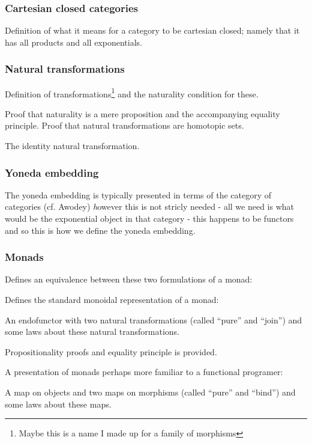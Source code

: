 \subsubsection{Cartesian closed categories}
Definition of what it means for a category to be cartesian closed; namely that
it has all products and all exponentials.

\subsubsection{Natural transformations}
Definition of transformations\footnote{Maybe this is a name I made up for a
  family of morphisms} and the naturality condition for these.

Proof that naturality is a mere proposition and the accompanying equality
principle. Proof that natural transformations are homotopic sets.

The identity natural transformation.

\subsubsection{Yoneda embedding}

The yoneda embedding is typically presented in terms of the category of
categories (cf. Awodey) \emph however this is not stricly needed - all we need
is what would be the exponential object in that category - this happens to be
functors and so this is how we define the yoneda embedding.

\subsubsection{Monads}

Defines an equivalence between these two formulations of a monad:


Defines the standard monoidal representation of a monad:

An endofunctor with two natural transformations (called ``pure'' and ``join'')
and some laws about these natural transformations.

Propositionality proofs and equality principle is provided.


A presentation of monads perhaps more familiar to a functional programer:

A map on objects and two maps on morphisms (called ``pure'' and ``bind'') and
some laws about these maps.

